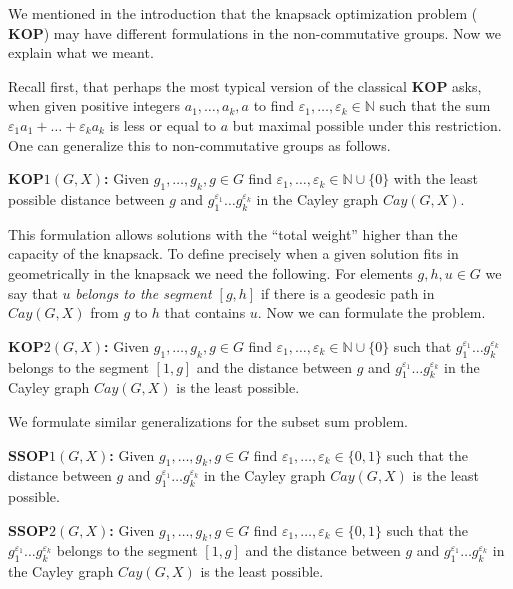 \documentclass[10pt]{amsart}
\theoremstyle{definition}
\def\KOP{{\mathbf{KOP}}}
\def\SSOP{{\mathbf{SSOP}}}
\begin{document}
We mentioned in the introduction that the knapsack optimization problem ($\KOP$) may have different formulations in the non-commutative groups.
Now we explain what we meant.

 Recall first, that perhaps the most typical version of the classical $\KOP$ asks, when given positive integers $a_1, \ldots, a_k,a$ to find $\varepsilon_1, \ldots, \varepsilon_k \in \mathbb{N}$ such that the sum  $ \varepsilon_1a_1 + \ldots +  \varepsilon_ka_k$ is less or equal to $a$ but  maximal possible under this restriction.  One can  generalize this  to  non-commutative groups as follows.

 \medskip \noindent
 {\bf $\KOP1(G,X)$\index{$\KOP1(G,X)$}:} Given $g_1,\ldots,g_k,g\in G$
find $\varepsilon_1, \ldots, \varepsilon_k \in \mathbb{N}\cup\{0\}$ with the least
possible distance between $g$ and $g_1^{\varepsilon_1} \ldots g_k^{\varepsilon_k}$ in the Cayley graph $Cay(G,X)$. 

\medskip
 This formulation allows solutions with the ``total weight'' higher than the capacity of the knapsack. To define precisely when a given solution fits in geometrically  in the knapsack we need the following. For elements  $g, h, u \in G$  we say that $u$  {\it belongs to the segment $[g,h]$} if there is a geodesic path in $Cay(G,X)$ from $g$ to $h$ that contains $u$.   Now we can formulate the problem.

  \medskip \noindent
 {\bf $\KOP2(G,X)$\index{$\KOP2(G,X)$}:} Given $g_1,\ldots,g_k,g\in G$
find $\varepsilon_1, \ldots, \varepsilon_k \in \mathbb{N}\cup\{0\}$ such that $g_1^{\varepsilon_1} \ldots g_k^{\varepsilon_k}$ belongs to the segment $[1,g]$ and the distance between $g$ and $g_1^{\varepsilon_1} \ldots g_k^{\varepsilon_k}$ in the Cayley graph $Cay(G,X)$ is the least possible.


\medskip

We formulate similar generalizations for the subset sum problem.

 \medskip \noindent
 {\bf $\SSOP1(G,X)$\index{$\SSOP1(G,X)$}:} Given $g_1,\ldots,g_k,g\in G$
find $\varepsilon_1, \ldots, \varepsilon_k \in \{0,1\}$ such that the distance between $g$ and $g_1^{\varepsilon_1} \ldots g_k^{\varepsilon_k}$ in the Cayley graph $Cay(G,X)$ is the least possible.

   \medskip \noindent
  {\bf $\SSOP2(G,X)$\index{$\SSOP1(G,X)$}:} Given $g_1,\ldots,g_k,g\in G$
 find $\varepsilon_1, \ldots, \varepsilon_k \in \{0,1\}$ such that the $g_1^{\varepsilon_1} \ldots g_k^{\varepsilon_k}$ belongs to the segment $[1,g]$ and the distance between $g$ and $g_1^{\varepsilon_1} \ldots g_k^{\varepsilon_k}$ in the Cayley graph $Cay(G,X)$ is the least possible.
\end{document}

